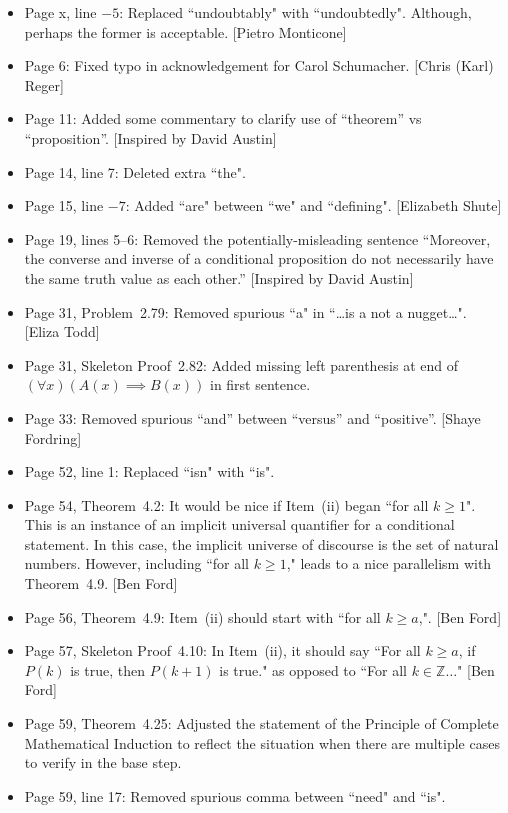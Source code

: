\documentclass[11pt]{article}%
\begin{document}
\begin{itemize}
\item Page x, line $-5$: Replaced ``undoubtably" with ``undoubtedly". Although, perhaps the former is acceptable. [Pietro Monticone]
\item Page 6: Fixed typo in acknowledgement for Carol Schumacher. [Chris (Karl) Reger]
\item Page 11: Added some commentary to clarify use of ``theorem'' vs ``proposition''. [Inspired by David Austin]
\item Page 14, line 7: Deleted extra ``the".
\item Page 15, line $-7$: Added ``are" between ``we" and ``defining". [Elizabeth Shute]
\item Page 19, lines 5--6: Removed the potentially-misleading sentence ``Moreover, the converse and inverse of a conditional proposition do not necessarily have the same truth value as each other.'' [Inspired by David Austin]
\item Page 31, Problem~2.79: Removed spurious ``a" in ``\ldots is a not a nugget\ldots". [Eliza Todd]
\item Page 31, Skeleton Proof~2.82: Added missing left parenthesis at end of $(\forall x)(A(x)\implies B(x))$ in first sentence.
\item Page 33: Removed spurious ``and'' between ``versus'' and ``positive''. [Shaye Fordring]
\item Page 52, line 1: Replaced ``isn" with ``is".
\item Page 54, Theorem~4.2: It would be nice if Item~(ii) began ``for all $k\geq 1$".  This is an instance of an implicit universal quantifier for a conditional statement.  In this case, the implicit universe of discourse is the set of natural numbers.  However, including ``for all $k\geq 1$," leads to a nice parallelism with Theorem~4.9. [Ben Ford]
\item Page 56, Theorem~4.9: Item~(ii) should start with ``for all $k\geq a$,". [Ben Ford]
\item Page 57, Skeleton Proof~4.10: In Item~(ii), it should say ``For all $k\geq a$, if $P(k)$ is true, then $P(k+1)$ is true." as opposed to ``For all $k\in\mathbb{Z}\ldots$" [Ben Ford]
\item Page 59, Theorem~4.25: Adjusted the statement of the Principle of Complete Mathematical Induction to reflect the situation when there are multiple cases to verify in the base step.
\item Page 59, line 17: Removed spurious comma between ``need" and ``is".

\end{itemize}
\end{document}

